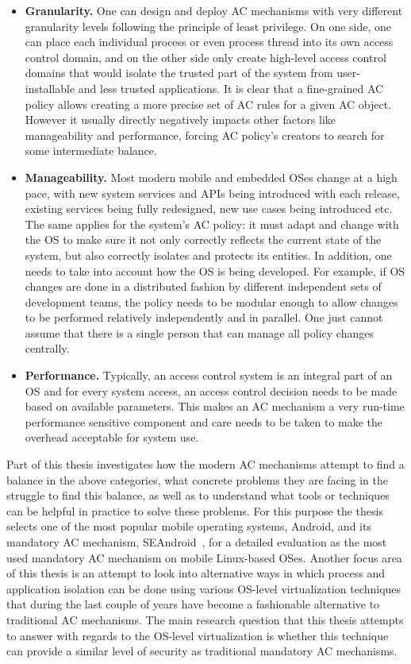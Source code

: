 \begin{itemize}
	\item \textbf{Granularity.} One can design and deploy AC mechanisms with very different granularity levels following the principle of least privilege. On one side, one can place each individual process or even process thread into its own access control domain, and on the other side only create high-level access control domains that would isolate the trusted part of the system from user-installable and less trusted applications. It is clear that a fine-grained AC policy allows creating a more precise set of AC rules for a given AC object. However it usually directly negatively impacts other factors like manageability and performance, forcing AC policy's creators to search for some intermediate balance.
	\item \textbf{Manageability.} Most modern mobile and embedded OSes change at a high pace, with new system services and APIs being introduced with each release, existing services being fully redesigned, new use cases being introduced etc. The same applies for the system's AC policy: it must adapt and change with the OS to make sure it not only correctly reflects the current state of the system, but also correctly isolates and protects its entities. In addition, one needs to take into account how the OS is being developed. For example, if OS changes are done in a distributed fashion by different independent sets of development teams, the policy needs to be modular enough to allow changes to be performed relatively independently and in parallel. One just cannot assume that there is a single person that can manage all policy changes centrally.  
	\item \textbf{Performance.} Typically, an access control system is an integral part of an OS and for every system access, an access control decision needs to be made based on available parameters. This makes an AC mechanism a very run-time performance sensitive component and care needs to be taken to make the overhead acceptable for system use. 
\end{itemize}

Part of this thesis investigates how the modern AC mechanisms attempt to find a balance in the above categories, what concrete problems they are facing in the struggle to find this balance, as well as to understand what tools or techniques can be helpful in practice to solve these problems. For this purpose the thesis selects one of the most popular mobile operating systems, Android, and its mandatory AC mechanism, SEAndroid~\cite{smalley12}, for a detailed evaluation as the most used mandatory AC mechanism on mobile Linux-based OSes. Another focus area of this thesis is an attempt to look into alternative ways in which process and application isolation can be done using various OS-level virtualization  techniques that during the last couple of years have become a fashionable alternative to traditional AC mechanisms. The main research question that this thesis attempts to answer with regards to the OS-level virtualization is whether this technique can provide a similar level of security as traditional mandatory AC mechanisms. 


